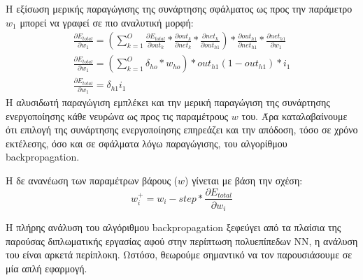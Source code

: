Η εξίσωση μερικής παραγώγισης της συνάρτησης σφάλματος ως προς την παράμετρο
$w_{1}$ μπορεί να γραφεί σε πιο αναλυτική μορφή:
\begin{gather*}
  \frac{\partial E_{total}}{\partial w_{1}} = (\sum_{k=1}^{O}\frac{\partial E_{total}}{\partial out_{k}}*\frac{\partial out_{k}}{\partial net_{k}}*\frac{\partial net_{k}}{\partial out_{h1}})*\frac{\partial out_{h1}}{\partial net_{h1}}*\frac{\partial net_{h1}}{\partial w_{1}} \\
  \frac{\partial E_{total}}{\partial w_{1}} = (\sum_{k=1}^{O}\delta_{ho}*w_{ho}) * out_{h1}(1-out_{h1}) * i_{1} \\
  \frac{\partial E_{total}}{\partial w_{1}} = \delta_{h1}i_{1}
\end{gather*}
Η αλυσιδωτή παραγώγιση εμπλέκει και την μερική παραγώγιση της
συνάρτησης ενεργοποίησης κάθε νευρώνα ως προς τις παραμέτρους $w$ του.
Άρα καταλαβαίνουμε ότι επιλογή της
συνάρτησης ενεργοποίησης επηρεάζει και την απόδοση, τόσο σε χρόνο εκτέλεσης,
όσο και σε σφάλματα λόγω παραγώγισης, του αλγορίθμου backpropagation.

Η δε ανανέωση των παραμέτρων βάρους ($w$) γίνεται με βάση την σχέση:
\begin{equation*}
  w_{i}^{+} = w_{i} - step * \frac{\partial E_{total}}{\partial w_{i}}
\end{equation*}

Η πλήρης ανάλυση του αλγόριθμου backpropagation ξεφεύγει από τα πλαίσια
της παρούσας διπλωματικής εργασίας αφού στην περίπτωση πολυεπίπεδων ΝΝ,
η ανάλυση του είναι αρκετά περίπλοκη. Ωστόσο, θεωρούμε σημαντικό να τον
παρουσιάσουμε σε μία απλή εφαρμογή.

\makeatletter
\newcommand{\HEADER}[1]{\State\ALC@it\underline{\textsc{#1}}\begin{ALC@g}}
\newcommand{\ENDHEADER}{\end{ALC@g}}
\makeatother
\newcommand{\STATEI}[1]{\State
  \begin{tabular}{@{}p{\dimexpr \textwidth-\labelwidth}@{}}%
    \hangindent \algorithmicindent
    \hangafter 1
    #1
  \end{tabular}
}

